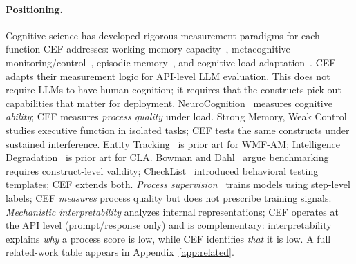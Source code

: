 \documentclass{article}
\begin{document}
\paragraph{Positioning.}
Cognitive science has developed rigorous measurement paradigms for each
function CEF addresses: working memory capacity~\citep{miller1956,baddeley1974},
metacognitive monitoring/control~\citep{flavell1979,nelson1990},
episodic memory~\citep{tulving1972episodic,johnson1993}, and cognitive
load adaptation~\citep{sweller1988,miyake2000}. CEF adapts their
measurement logic for API-level LLM evaluation. This does not require
LLMs to have human cognition; it requires that the constructs pick out
capabilities that matter for deployment.
NeuroCognition~\citep{haznitrama2026neuropsychologicallygroundedevaluationllm}
measures cognitive \emph{ability}; CEF measures \emph{process quality}
under load. Strong Memory, Weak
Control~\citep{de2025strong} studies executive function in isolated
tasks; CEF tests the same constructs under sustained interference.
Entity Tracking~\citep{entitytracking2023} is prior art for WMF-AM;
Intelligence Degradation~\citep{wang2026intelligence} is prior art for
CLA. Bowman and Dahl~\citep{bowman2021fix} argue benchmarking requires
construct-level validity; CheckList~\citep{ribeiro2020checklist}
introduced behavioral testing templates; CEF extends both.
\emph{Process supervision}~\citep{lightman2023verify,uesato2022solving}
trains models using step-level labels; CEF \emph{measures} process
quality but does not prescribe training signals.
\emph{Mechanistic interpretability} analyzes internal representations;
CEF operates at the API level (prompt/response only) and is
complementary: interpretability explains \emph{why} a process score is
low, while CEF identifies \emph{that} it is low.
A full related-work table appears in Appendix~\ref{app:related}.
\end{document}
